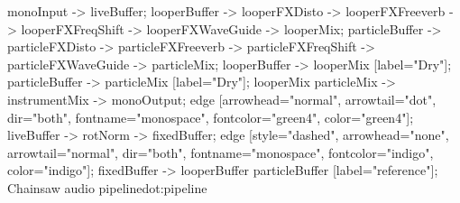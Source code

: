 \documentclass[a4paper,oneside,titlepage]{article}
\begin{document}
{{      monoInput -> liveBuffer;
      looperBuffer -> looperFXDisto -> looperFXFreeverb -> looperFXFreqShift -> looperFXWaveGuide -> looperMix;
      particleBuffer -> particleFXDisto -> particleFXFreeverb -> particleFXFreqShift -> particleFXWaveGuide -> particleMix;
      looperBuffer -> looperMix [label="Dry"];
      particleBuffer -> particleMix [label="Dry"];
      {looperMix particleMix} -> instrumentMix -> monoOutput;
      edge [arrowhead="normal", arrowtail="dot", dir="both", fontname="monospace", fontcolor="green4", color="green4"];
      liveBuffer -> rotNorm -> fixedBuffer;
      edge [style="dashed", arrowhead="none", arrowtail="normal", dir="both", fontname="monospace", fontcolor="indigo", color="indigo"];
      fixedBuffer -> {looperBuffer particleBuffer} [label="reference"];
    }{Chainsaw audio pipeline}{dot:pipeline}
}
\end{document}
